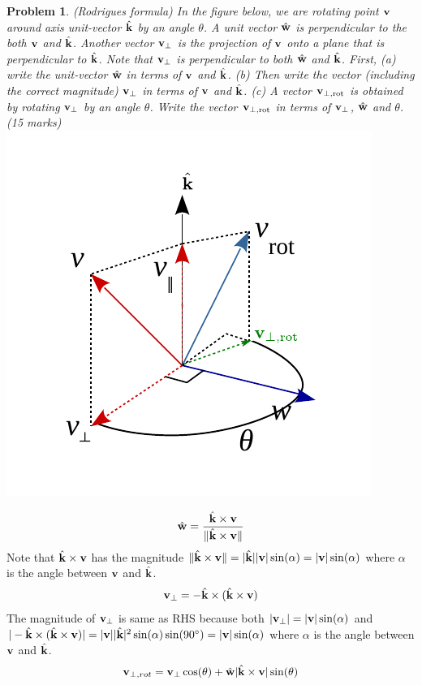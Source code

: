 \documentclass{article}
\newtheorem{prob}{Problem}
\begin{document}
\begin{prob}
  (Rodrigues formula) In the figure below, we are rotating point $\mathbf{v}$ around
  axis unit-vector $\hat{\mathbf{k}}$ by an angle $\theta$. A unit vector $\hat{\mathbf{w}}$ is
  perpendicular to the both $\mathbf{v}$ and $\hat{\mathbf{k}}$. Another vector $\mathbf{v}_{\perp}$ is the projection of $\mathbf{v}$ onto a plane that is perpendicular to $\hat{\mathbf{k}}$. Note that $\mathbf{v}_{\perp}$ is perpendicular to both $\hat{\mathbf{w}}$ and $\hat{\mathbf{k}}$. First, (a) write the
  unit-vector $\hat{\mathbf{w}}$ in terms of $\mathbf{v}$ and $\hat{\mathbf{k}}$.
  (b) Then write the vector (including the correct magnitude) $\mathbf{v}_\perp$ in terms of $\mathbf{v}$ and $\hat{\mathbf{k}}$.
  (c) A vector $\mathbf{v}_{\perp,\text{rot}}$ is obtained by rotating $\mathbf{v}_\perp$ by an angle $\theta$. Write the vector $\mathbf{v}_{\perp,\text{rot}}$ in terms of $\mathbf{v}_{\perp}$, $\hat{\mathbf{w}}$ and $\theta$. 
  (15 marks)\\
  \includegraphics[width=0.5\linewidth]{media/Rodrigues-formula.pdf}
\end{prob}
\begin{align}
  \hat{\mathbf{w}} = \frac{\hat{\mathbf{k}} \times \mathbf{v}}{\|\hat{\mathbf{k}} \times \mathbf{v}\|}
\end{align}
Note that $\hat{\mathbf{k}} \times \mathbf{v}$ has the magnitude $\|\hat{\mathbf{k}} \times \mathbf{v}\| = |\hat{\mathbf{k}}||\mathbf{v}| \sin(\alpha) = |\mathbf{v}| \sin(\alpha)$ where $\alpha$ is the angle between $\mathbf{v}$ and $\hat{\mathbf{k}}$.
\begin{align}
\mathbf{v}_\perp = -\hat{\mathbf{k}} \times (\hat{\mathbf{k}} \times \mathbf{v})
\end{align}
The magnitude of $\mathbf{v}_\perp$ is same as RHS because both $|\mathbf{v}_\perp| = |\mathbf{v}|\sin(\alpha)$ and $|-\hat{\mathbf{k}} \times (\hat{\mathbf{k}}  \times \mathbf{v})| = |\mathbf{v}||\hat{\mathbf{k}}|^2 \sin(\alpha) \sin(90^\circ) = |\mathbf{v}|\sin(\alpha)$ where $\alpha$ is the angle between $\mathbf{v}$ and $\hat{\mathbf{k}}$.
\begin{align}
  \mathbf{v}_{\perp,rot} = \mathbf{v}_\perp \cos(\theta) +
  \hat{\mathbf{w}}|\hat{\mathbf{k}} \times \mathbf{v}| \sin(\theta)
\end{align}
\end{document}
